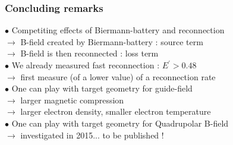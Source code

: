 \documentclass{beamer}
\begin{document}



\begin{frame}
\frametitle{Concluding remarks}

$\bullet$ Competiting effects of Biermann-battery and reconnection \\
$\to$ B-field created by Biermann-battery : source term \\
$\to$ B-field is then reconnected : loss term \\[0.6cm]

$\bullet$ We already measured fast reconnection : $E^{\prime} > 0.48$ \\
$\to$ first measure (of a lower value) of a reconnection rate \\[0.6cm]

$\bullet$ One can play with target geometry for guide-field\\
$\to$ larger magnetic compression \\
$\to$ larger electron density, smaller electron temperature \\[0.6cm]

$\bullet$ One can play with target geometry for Quadrupolar B-field\\
$\to$ investigated in 2015... to be published !\\[0.6cm]



\end{frame}
\end{document}
